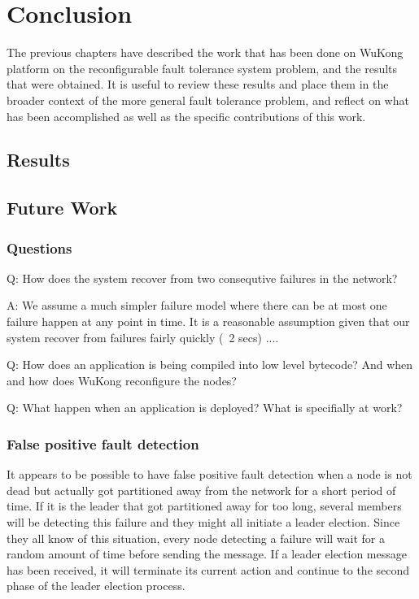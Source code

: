 \cleardoublepage
\singlespacing
\chapter{Conclusion}
\label{c:conclusion}
\doublespacing\nointerlineskip

The previous chapters have described the work that has been done on WuKong
platform on the reconfigurable fault tolerance system problem, and the results
that were obtained. It is useful to review these results and place them in the
broader context of the more general fault tolerance problem, and reflect on
what has been accomplished as well as the specific contributions of this work.

\section{Results}

\section{Future Work}


\subsection{Questions}

Q: How does the system recover from two consequtive failures in the network?

A: We assume a much simpler failure model where there can be at most one
failure happen at any point in time. It is a reasonable assumption given that
our system recover from failures fairly quickly (~2 secs) ....


Q: How does an application is being compiled into low level bytecode? And when
and how does WuKong reconfigure the nodes?


Q: What happen when an application is deployed? What is specifially at work?

\subsection{False positive fault detection}

It appears to be possible to have false positive fault detection when a node is not dead but actually got partitioned away from the network for a short period of time. If it is the leader that got partitioned away for too long, several members will be detecting this failure and they might all initiate a leader election. Since they all know of this situation, every node detecting a failure will wait for a random amount of time before sending the message. If a leader election message has been received, it will terminate its current action and continue to the second phase of the leader election process.

